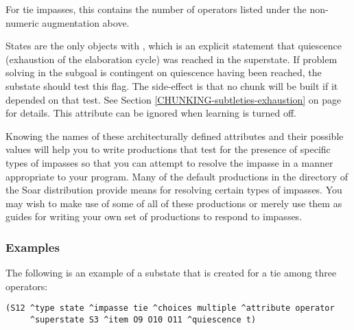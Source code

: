 \begin{description}
	\vspace{-8pt}
\item [\soar{\carat non-numeric-count}]
	For tie impasses, this contains the number of operators listed under the non-numeric augmentation above.
	\vspace{-8pt}
\item [\soar{\carat quiescence}]
	States are the only objects with , which is an explicit statement that quiescence (exhaustion of the elaboration cycle) was reached in the superstate.  If problem solving in the subgoal is contingent on quiescence having been reached, the substate should test this flag. The side-effect is that no chunk will be built if it depended on that test. See Section \ref{CHUNKING-subtleties-exhaustion} on page \pageref{CHUNKING-subtleties-exhaustion} for details. This attribute can be ignored when learning is turned off.
\end{description}

Knowing the names of these architecturally defined attributes and their possible values will help you to write productions that test for the presence of specific types of impasses so that you can attempt to resolve the impasse in a manner appropriate to your program. Many of the default productions in the  directory of the Soar distribution  provide means for resolving certain types of impasses. You may wish to make use of some of all of these productions or merely use them as guides for writing your own set of productions to respond to impasses.

\subsubsection*{Examples}


The following is an example of a substate that is created for a tie among three operators:


\begin{verbatim}
(S12 ^type state ^impasse tie ^choices multiple ^attribute operator
     ^superstate S3 ^item O9 O10 O11 ^quiescence t)
\end{verbatim}
\vspace{12pt}

